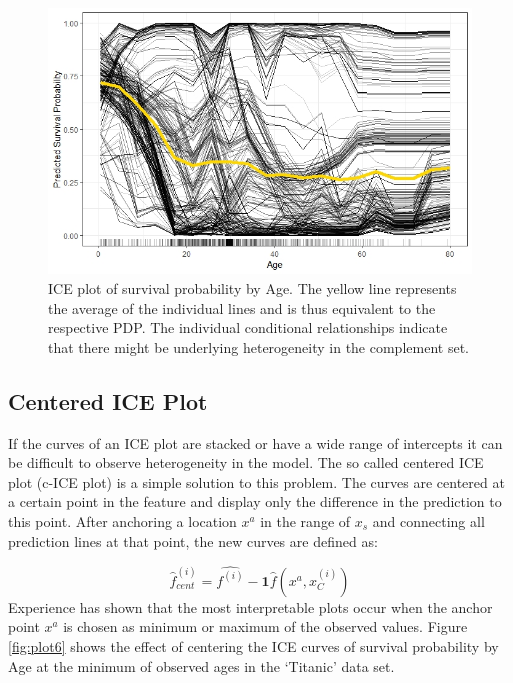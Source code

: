 \documentclass[
]{krantz}
\begin{document}
\begin{figure}

{\centering \includegraphics[width=0.8\linewidth]{images/PDP_Plot_5} 

}

\caption{ICE plot of survival probability by Age. The yellow line represents the average of the individual lines and is thus equivalent to the respective PDP. The individual conditional relationships indicate that there might be underlying heterogeneity in the complement set.}\label{fig:plot5}
\end{figure}

\hypertarget{centered-ice-plot}{%
\subsection{Centered ICE Plot}\label{centered-ice-plot}}

If the curves of an ICE plot are stacked or have a wide range of intercepts it can be difficult to observe heterogeneity in the model. The so called centered ICE plot (c-ICE plot) is a simple solution to this problem. The curves are centered at a certain point in the feature and display only the difference in the prediction to this point.\citep{molnar2019} After anchoring a location \(x^a\) in the range of \(x_s\) and connecting all prediction lines at that point, the new curves are defined as:

\[\hat{f}^{(i)}_{cent} = \hat{f^{(i)}} - \mathbf{1}\hat{f}(x^a,x^{(i)}_C)\]
Experience has shown that the most interpretable plots occur when the anchor point \(x^a\) is chosen as minimum or maximum of the observed values. Figure \ref{fig:plot6} shows the effect of centering the ICE curves of survival probability by Age at the minimum of observed ages in the `Titanic' data set.
\end{document}
